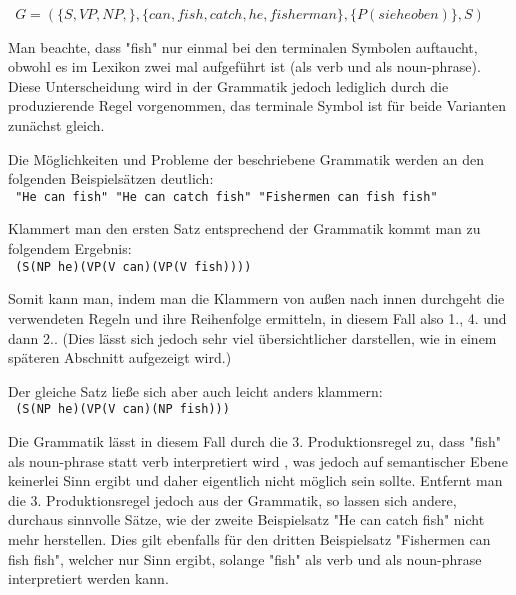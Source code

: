 \documentclass[12pt]{report}
\begin{document}
\begin{center}
\tt
$G=(\lbrace S,VP,NP,\rbrace ,\lbrace can, fish, catch, he, fisherman\rbrace ,\lbrace P(siehe oben)\rbrace ,S)$
\rm
\end{center}

Man beachte, dass "fish" nur einmal bei den terminalen Symbolen auftaucht, obwohl es im Lexikon zwei mal aufgeführt ist (als verb und als noun-phrase). Diese Unterscheidung wird in der Grammatik jedoch lediglich durch die produzierende Regel vorgenommen, das terminale Symbol ist für beide Varianten zunächst gleich.

Die Möglichkeiten und Probleme der beschriebene Grammatik werden an den folgenden Beispielsätzen deutlich:
\\

\tt
"He can fish"
"He can catch fish"
"Fishermen can fish fish"
\rm

Klammert man den ersten Satz entsprechend der Grammatik kommt man zu folgendem Ergebnis:\\

\tt 
(S(NP he)(VP(V can)(VP(V fish))))\\
\rm

Somit kann man, indem man die Klammern von außen nach innen durchgeht die verwendeten Regeln und ihre Reihenfolge ermitteln, in diesem Fall also 1., 4. und dann 2.. (Dies lässt sich jedoch sehr viel übersichtlicher darstellen, wie in einem späteren Abschnitt aufgezeigt wird.)

Der gleiche Satz ließe sich aber auch leicht anders klammern:\\

\tt
(S(NP he)(VP(V can)(NP fish)))\\
\rm

Die Grammatik lässt in diesem Fall durch die 3. Produktionsregel zu, dass "fish" als noun-phrase statt verb interpretiert wird , was jedoch auf semantischer Ebene keinerlei Sinn ergibt und daher eigentlich nicht möglich sein sollte. Entfernt man die 3. Produktionsregel jedoch aus der Grammatik, so lassen sich andere, durchaus sinnvolle Sätze, wie der zweite Beispielsatz "He can catch fish" nicht mehr herstellen. Dies gilt ebenfalls für den dritten Beispielsatz "Fishermen can fish fish", welcher nur Sinn ergibt, solange "fish" als verb und als noun-phrase interpretiert werden kann.
\end{document}

